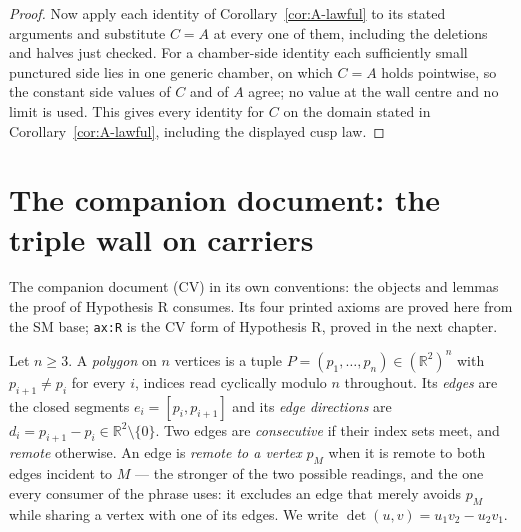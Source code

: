 \begin{proof}
Now apply each identity of Corollary~\ref{cor:A-lawful} to its stated
arguments and substitute $C=A$ at every one of them, including the
deletions and halves just checked. For a chamber-side identity each
sufficiently small punctured side lies in one generic chamber, on which
$C=A$ holds pointwise, so the constant side values of $C$ and of $A$
agree; no value at the wall centre and no limit is used. This gives every
identity for $C$ on the domain stated in Corollary~\ref{cor:A-lawful},
including the displayed cusp law.
\end{proof}

\chapter{The companion document: the triple wall on carriers}
The companion document (CV) in its own conventions: the objects and lemmas the proof of Hypothesis R consumes. Its four printed axioms are proved here from the SM base; \texttt{ax:R} is the CV form of Hypothesis R, proved in the next chapter.

\begin{definition}[polygon]\label{CV:def:polygon}\leanok
Let $n\geq3$. A \emph{polygon} on $n$ vertices is a tuple
$P=(p_1,\dots,p_n)\in(\mathbb{R}^2)^n$ with $p_{i+1}\neq p_i$ for every $i$,
indices read cyclically modulo $n$ throughout. Its \emph{edges} are the closed
segments $e_i=[p_i,p_{i+1}]$ and its \emph{edge directions} are
$d_i=p_{i+1}-p_i\in\mathbb{R}^2\setminus\{0\}$. Two edges are \emph{consecutive}
if their index sets meet, and \emph{remote} otherwise. An edge is \emph{remote
to a vertex} $p_M$ when it is remote to both edges incident to $M$ --- the
stronger of the two possible readings, and the one every consumer of the phrase
uses: it excludes an edge that merely avoids $p_M$ while sharing a vertex with
one of its edges. We write
$\det(u,v)=u_1v_2-u_2v_1$.
\end{definition}

